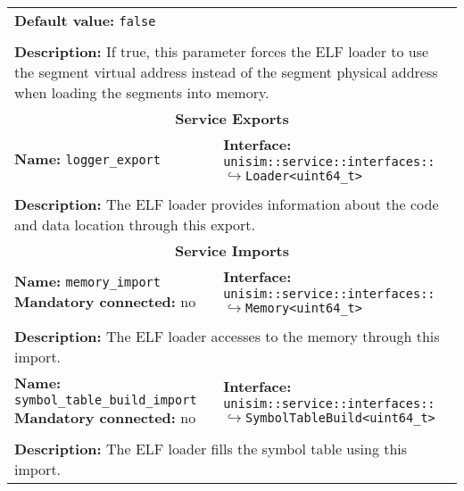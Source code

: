 \begin{center}
\begin{tabular}{|p{7.5cm}|p{7.5cm}|}
		\multicolumn{2}{|p{15cm}|}{\textbf{Default value:} \texttt{false}}\\
		\multicolumn{2}{|l|}{}\\
		\multicolumn{2}{|p{15cm}|}{\textbf{Description:} \newline If true, this parameter forces the ELF loader to use the segment virtual address instead of the segment physical address when loading the segments into memory.}\\
		\hline
		\hline
		\multicolumn{2}{|c|}{\textbf{\large Service Exports}}\\
		\hline
		\multicolumn{1}{|p{7.5cm}}{\textbf{Name:} \texttt{logger\_export}} & \multicolumn{1}{p{7.5cm}|}{\textbf{Interface:} \newline \texttt{unisim::service::interfaces::} \newline$\hookrightarrow$\texttt{Loader<uint64\_t>}}\\
		\multicolumn{2}{|l|}{}\\
		\multicolumn{2}{|p{15cm}|}{\textbf{Description:} \newline The ELF loader provides information about the code and data location through this export.}\\
		\hline
		\hline
		\multicolumn{2}{|c|}{\textbf{\large Service Imports}}\\
		\hline
		\multicolumn{1}{|p{7.5cm}}{\textbf{Name:} \texttt{memory\_import} \newline \textbf{Mandatory connected:} no} & \multicolumn{1}{p{7.5cm}|}{\textbf{Interface:} \newline \texttt{unisim::service::interfaces::} \newline$\hookrightarrow$\texttt{Memory<uint64\_t>}}\\
		\multicolumn{2}{|l|}{}\\
		\multicolumn{2}{|p{15cm}|}{\textbf{Description:} \newline The ELF loader accesses to the memory through this import.}\\
		\hline
		\multicolumn{1}{|p{7.5cm}}{\textbf{Name:} \texttt{symbol\_table\_build\_import} \newline \textbf{Mandatory connected:} no} & \multicolumn{1}{p{7.5cm}|}{\textbf{Interface:} \newline \texttt{unisim::service::interfaces::} \newline$\hookrightarrow$\texttt{SymbolTableBuild<uint64\_t>}}\\
		\multicolumn{2}{|l|}{}\\
		\multicolumn{2}{|p{15cm}|}{\textbf{Description:} \newline The ELF loader fills the symbol table using this import.}\\
		\hline
	\end{tabular}
\end{center}

